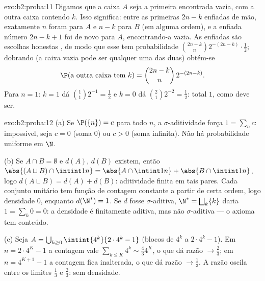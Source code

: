 \begin{solution}{exo:b2:proba:11}
Digamos que a caixa $A$ seja a primeira encontrada vazia, com a outra
caixa contendo $k$. Isso significa: entre as primeiras $2n - k$
enfiadas de mão, exatamente $n$ foram para $A$ e $n - k$ para $B$ (em alguma
ordem), e a enfiada número $2n - k + 1$ foi de novo para $A$,
encontrando-a vazia. As enfiadas são escolhas honestas ,
de modo que esse  tem probabilidade
$\binom{2n-k}{n}2^{-(2n-k)}\cdot\frac12$; dobrando (a caixa vazia
pode ser qualquer uma das duas) obtém-se
\[
\P(\text{a outra caixa tem }k) = \binom{2n-k}{n}\,2^{-(2n-k)} .
\]
Para $n = 1$: $k = 1$ dá $\binom11 2^{-1} = \frac12$ e $k
= 0$ dá $\binom21 2^{-2} = \frac12$: total $1$, como deve
ser.
\end{solution}

\begin{solution}{exo:b2:proba:12}
(a) Se $\P(\{n\}) = c$ para todo $n$, a $\sigma$-aditividade
força $1 = \sum_nc$: impossível, seja $c = 0$ (soma $0$)
ou $c > 0$ (soma infinita). Não há probabilidade uniforme em
$\N$.

(b) Se $A \cap B = \emptyset$ e $d(A)$, $d(B)$ existem, então
$\abs{(A \sqcup B)\cap\intint1n} = \abs{A\cap\intint1n} +
\abs{B\cap\intint1n}$, logo $d(A \sqcup B) = d(A) + d(B)$:
aditividade finita em tais pares. Cada conjunto unitário tem função
de contagem constante a partir de certa ordem, logo densidade $0$, enquanto
$d(\N^*) = 1$. Se $d$ fosse $\sigma$-aditiva, $\N^* =
\bigsqcup_k\{k\}$ daria $1 = \sum_k 0 = 0$: a densidade é
finitamente aditiva, mas não $\sigma$-aditiva --- o axioma tem
conteúdo.

(c) Seja $A = \bigcup_{k\geq0}\intint{4^k}{2\cdot4^k - 1}$
(blocos de $4^k$ a $2\cdot4^k - 1$). Em $n = 2\cdot4^K -
1$ a contagem vale $\sum_{k\leq K}4^k \sim \frac43 4^K$, o que dá
razão $\to \frac23$; em $n = 4^{K+1} - 1$ a contagem fica
inalterada, o que dá razão $\to \frac13$. A razão oscila
entre os limites $\frac13$ e $\frac23$: sem densidade.
\end{solution}

